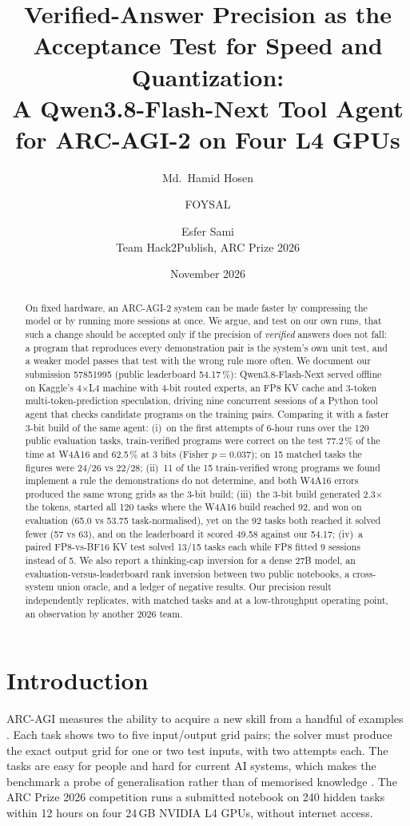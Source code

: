 \documentclass[11pt]{article}
\title{Verified-Answer Precision as the Acceptance Test for Speed and Quantization:\\
A Qwen3.8-Flash-Next Tool Agent for ARC-AGI-2 on Four L4 GPUs}
\author{Md.\ Hamid Hosen \and FOYSAL \and Esfer Sami\\[2pt]
\small Team Hack2Publish, ARC Prize 2026}
\date{November 2026}
\begin{document}
\maketitle

\begin{abstract}
On fixed hardware, an ARC-AGI-2 system can be made faster by compressing the model or by running more sessions at once.
We argue, and test on our own runs, that such a change should be accepted only if the precision of \emph{verified} answers does not fall: a program that reproduces every demonstration pair is the system's own unit test, and a weaker model passes that test with the wrong rule more often.
We document our submission 57851995 (public leaderboard 54.17\,\%): Qwen3.8-Flash-Next served offline on Kaggle's 4$\times$L4 machine with 4-bit routed experts, an FP8 KV cache and 3-token multi-token-prediction speculation, driving nine concurrent sessions of a Python tool agent that checks candidate programs on the training pairs.
Comparing it with a faster 3-bit build of the same agent:
(i)~on the first attempts of 6-hour runs over the 120 public evaluation tasks, train-verified programs were correct on the test 77.2\,\% of the time at W4A16 and 62.5\,\% at 3 bits (Fisher $p=0.037$); on 15 matched tasks the figures were 24/26 vs 22/28;
(ii)~11 of the 15 train-verified wrong programs we found implement a rule the demonstrations do not determine, and both W4A16 errors produced the same wrong grids as the 3-bit build;
(iii)~the 3-bit build generated 2.3$\times$ the tokens, started all 120 tasks where the W4A16 build reached 92, and won on evaluation (65.0 vs 53.75 task-normalised), yet on the 92 tasks both reached it solved fewer (57 vs 63), and on the leaderboard it scored 49.58 against our 54.17;
(iv)~a paired FP8-vs-BF16 KV test solved 13/15 tasks each while FP8 fitted 9 sessions instead of 5.
We also report a thinking-cap inversion for a dense 27B model, an evaluation-versus-leaderboard rank inversion between two public notebooks, a cross-system union oracle, and a ledger of negative results.
Our precision result independently replicates, with matched tasks and at a low-throughput operating point, an observation by another 2026 team.
\end{abstract}

\section{Introduction}
ARC-AGI measures the ability to acquire a new skill from a handful of examples \cite{chollet2019,arcagi2}. Each task shows two to five input/output grid pairs; the solver must produce the exact output grid for one or two test inputs, with two attempts each. The tasks are easy for people and hard for current AI systems, which makes the benchmark a probe of generalisation rather than of memorised knowledge \cite{arctr2025}.
The ARC Prize 2026 competition runs a submitted notebook on 240 hidden tasks within 12 hours on four 24\,GB NVIDIA L4 GPUs, without internet access.
\end{document}
